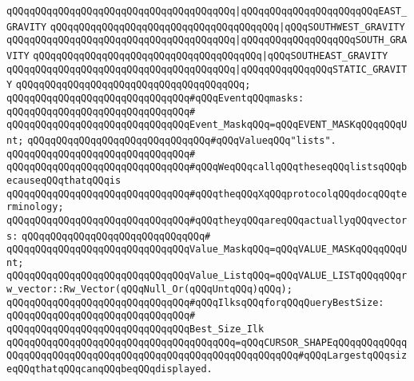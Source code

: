 \verb|qQQqqQQqqQQqqQQqqQQqqQQqqQQqqQQqqQQqqQQq|\verb#|qQQqqQQqqQQqqQQqqQQqqQQqEAST_GRAVITY#\newline
\verb|qQQqqQQqqQQqqQQqqQQqqQQqqQQqqQQqqQQqqQQq|\verb#|qQQqSOUTHWEST_GRAVITY#\newline
\verb|qQQqqQQqqQQqqQQqqQQqqQQqqQQqqQQqqQQqqQQq|\verb#|qQQqqQQqqQQqqQQqqQQqSOUTH_GRAVITY#\newline
\verb|qQQqqQQqqQQqqQQqqQQqqQQqqQQqqQQqqQQqqQQq|\verb#|qQQqSOUTHEAST_GRAVITY#\newline
\verb|qQQqqQQqqQQqqQQqqQQqqQQqqQQqqQQqqQQqqQQq|\verb#|qQQqqQQqqQQqqQQqSTATIC_GRAVITY#\newline
\verb|qQQqqQQqqQQqqQQqqQQqqQQqqQQqqQQqqQQqqQQq;|\newline
\newline
\verb|qQQqqQQqqQQqqQQqqQQqqQQqqQQqqQQq#qQQqEventqQQqmasks:|\newline
\verb|qQQqqQQqqQQqqQQqqQQqqQQqqQQqqQQq#|\newline
\verb|qQQqqQQqqQQqqQQqqQQqqQQqqQQqqQQqEvent_MaskqQQq=qQQqEVENT_MASKqQQqqQQqUnt;|\newline
\newline
\verb|qQQqqQQqqQQqqQQqqQQqqQQqqQQqqQQq#qQQqValueqQQq"lists".|\newline
\verb|qQQqqQQqqQQqqQQqqQQqqQQqqQQqqQQq#|\newline
\verb|qQQqqQQqqQQqqQQqqQQqqQQqqQQqqQQq#qQQqWeqQQqcallqQQqtheseqQQqlistsqQQqbecauseqQQqthatqQQqis|\newline
\verb|qQQqqQQqqQQqqQQqqQQqqQQqqQQqqQQq#qQQqtheqQQqXqQQqprotocolqQQqdocqQQqterminology;|\newline
\verb|qQQqqQQqqQQqqQQqqQQqqQQqqQQqqQQq#qQQqtheyqQQqareqQQqactuallyqQQqvectors:|\newline
\verb|qQQqqQQqqQQqqQQqqQQqqQQqqQQqqQQq#|\newline
\verb|qQQqqQQqqQQqqQQqqQQqqQQqqQQqqQQqValue_MaskqQQq=qQQqVALUE_MASKqQQqqQQqUnt;|\newline
\verb|qQQqqQQqqQQqqQQqqQQqqQQqqQQqqQQqValue_ListqQQq=qQQqVALUE_LISTqQQqqQQqrw_vector::Rw_Vector(qQQqNull_Or(qQQqUntqQQq)qQQq);|\newline
\newline
\verb|qQQqqQQqqQQqqQQqqQQqqQQqqQQqqQQq#qQQqIlksqQQqforqQQqQueryBestSize:|\newline
\verb|qQQqqQQqqQQqqQQqqQQqqQQqqQQqqQQq#|\newline
\verb|qQQqqQQqqQQqqQQqqQQqqQQqqQQqqQQqBest_Size_Ilk|\newline
\verb|qQQqqQQqqQQqqQQqqQQqqQQqqQQqqQQqqQQqqQQq=qQQqCURSOR_SHAPEqQQqqQQqqQQqqQQqqQQqqQQqqQQqqQQqqQQqqQQqqQQqqQQqqQQqqQQqqQQqqQQq#qQQqLargestqQQqsizeqQQqthatqQQqcanqQQqbeqQQqdisplayed.|\newline
